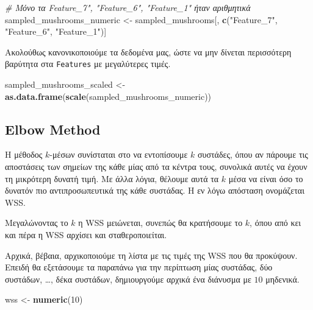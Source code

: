 \documentclass[
]{article}
\newenvironment{Shaded}{\begin{snugshade}}{\end{snugshade}}
\newcommand{\CommentTok}[1]{\textcolor[rgb]{0.56,0.35,0.01}{\textit{#1}}}
\newcommand{\DecValTok}[1]{\textcolor[rgb]{0.00,0.00,0.81}{#1}}
\newcommand{\FunctionTok}[1]{\textcolor[rgb]{0.13,0.29,0.53}{\textbf{#1}}}
\newcommand{\NormalTok}[1]{#1}
\newcommand{\OtherTok}[1]{\textcolor[rgb]{0.56,0.35,0.01}{#1}}
\newcommand{\StringTok}[1]{\textcolor[rgb]{0.31,0.60,0.02}{#1}}
\begin{document}
\begin{Shaded}
\begin{Highlighting}[]
\CommentTok{\# Μόνο τα Feature\_7", "Feature\_6", "Feature\_1" ήταν αριθμητικά}
\NormalTok{sampled\_mushrooms\_numeric }\OtherTok{\textless{}{-}}\NormalTok{ sampled\_mushrooms[, }\FunctionTok{c}\NormalTok{(}\StringTok{"Feature\_7"}\NormalTok{, }\StringTok{"Feature\_6"}\NormalTok{, }\StringTok{"Feature\_1"}\NormalTok{)]}
\end{Highlighting}
\end{Shaded}

Ακολούθως κανονικοποιούμε τα δεδομένα μας, ώστε να μην δίνεται
περισσότερη βαρύτητα στα \texttt{Features} με μεγαλύτερες τιμές.

\begin{Shaded}
\begin{Highlighting}[]
\NormalTok{sampled\_mushrooms\_scaled }\OtherTok{\textless{}{-}} \FunctionTok{as.data.frame}\NormalTok{(}\FunctionTok{scale}\NormalTok{(sampled\_mushrooms\_numeric))}
\end{Highlighting}
\end{Shaded}

\subsection{Elbow Method}\label{elbow-method}

Η μέθοδος \(k\)-μέσων συνίσταται στο να εντοπίσουμε \(k\) συστάδες, όπου
αν πάρουμε τις αποστάσεις των σημείων της κάθε μίας από τα κέντρα τους,
συνολικά αυτές να έχουν τη μικρότερη δυνατή τιμή. Με άλλα λόγια, θέλουμε
αυτά τα \(k\) μέσα να είναι όσο το δυνατόν πιο αντιπροσωπευτικά της κάθε
συστάδας. Η εν λόγω απόσταση ονομάζεται WSS.

Μεγαλώνοντας το \(k\) η WSS μειώνεται, συνεπώς θα κρατήσουμε το \(k\),
όπου από κει και πέρα η WSS αρχίσει και σταθεροποιείται.

Αρχικά, βέβαια, αρχικοποιούμε τη λίστα με τις τιμές της WSS που θα
προκύψουν. Επειδή θα εξετάσουμε τα παραπάνω για την περίπτωση μίας
συστάδας, δύο συστάδων, \ldots, δέκα συστάδων, δημιουργούμε αρχικά ένα
διάνυσμα με \(10\) μηδενικά.

\begin{Shaded}
\begin{Highlighting}[]
\NormalTok{wss }\OtherTok{\textless{}{-}} \FunctionTok{numeric}\NormalTok{(}\DecValTok{10}\NormalTok{)}
\end{Highlighting}
\end{Shaded}
\end{document}
